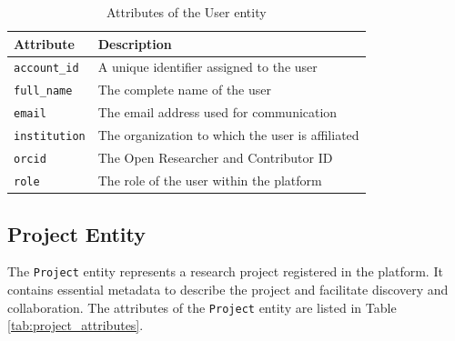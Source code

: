 \documentclass{article}
\begin{document}
\begin{table}[h]
      \centering
      \caption{Attributes of the User entity}
      \label{tab:user_attributes}
      \begin{tabular}{|l|l|}
            \hline
            \textbf{Attribute}   & \textbf{Description}                             \\ \hline
            \texttt{account\_id} & A unique identifier assigned to the user         \\ \hline
            \texttt{full\_name}  & The complete name of the user                    \\ \hline
            \texttt{email}       & The email address used for communication         \\ \hline
            \texttt{institution} & The organization to which the user is affiliated \\ \hline
            \texttt{orcid}       & The Open Researcher and Contributor ID           \\ \hline
            \texttt{role}        & The role of the user within the platform         \\ \hline
      \end{tabular}
\end{table}

\subsection{Project Entity}
The \texttt{Project} entity represents a research project registered in the platform. It contains essential metadata to describe the project and facilitate discovery and collaboration. The attributes of the \texttt{Project} entity are listed in Table \ref{tab:project_attributes}.
\end{document}

